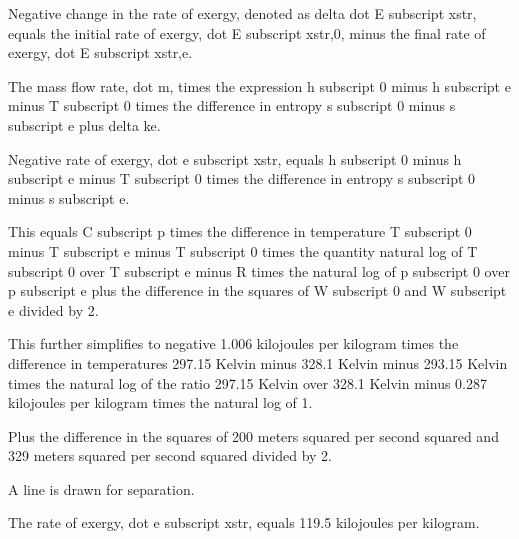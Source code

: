 Negative change in the rate of exergy, denoted as delta dot E subscript xstr, equals the initial rate of exergy, dot E subscript xstr,0, minus the final rate of exergy, dot E subscript xstr,e.

The mass flow rate, dot m, times the expression h subscript 0 minus h subscript e minus T subscript 0 times the difference in entropy s subscript 0 minus s subscript e plus delta ke.

Negative rate of exergy, dot e subscript xstr, equals h subscript 0 minus h subscript e minus T subscript 0 times the difference in entropy s subscript 0 minus s subscript e.

This equals C subscript p times the difference in temperature T subscript 0 minus T subscript e minus T subscript 0 times the quantity natural log of T subscript 0 over T subscript e minus R times the natural log of p subscript 0 over p subscript e plus the difference in the squares of W subscript 0 and W subscript e divided by 2.

This further simplifies to negative 1.006 kilojoules per kilogram times the difference in temperatures 297.15 Kelvin minus 328.1 Kelvin minus 293.15 Kelvin times the natural log of the ratio 297.15 Kelvin over 328.1 Kelvin minus 0.287 kilojoules per kilogram times the natural log of 1.

Plus the difference in the squares of 200 meters squared per second squared and 329 meters squared per second squared divided by 2.

A line is drawn for separation.

The rate of exergy, dot e subscript xstr, equals 119.5 kilojoules per kilogram.